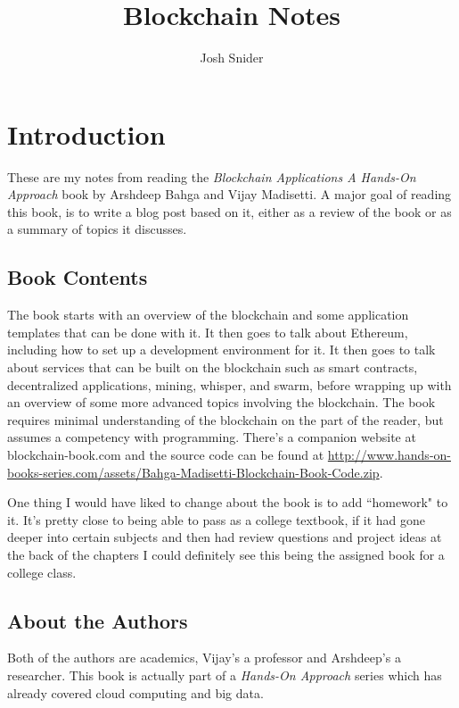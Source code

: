 \documentclass{article}
\begin{document}
\title{Blockchain Notes}
\author{Josh Snider}

\maketitle


\section{Introduction}
These are my notes from reading the \textit{Blockchain Applications A Hands-On Approach} book by Arshdeep Bahga and Vijay Madisetti. A major goal of reading this book, is to write a blog post based on it, either as a review of the book or as a summary of topics it discusses.

\subsection{Book Contents}
The book starts with an overview of the blockchain and some application templates that can be done with it. It then goes to talk about Ethereum, including how to set up a development environment for it. It then goes to talk about services that can be built on the blockchain such as smart contracts, decentralized applications, mining, whisper, and swarm, before wrapping up with an overview of some more advanced topics involving the blockchain. The book requires minimal understanding of the blockchain on the part of the reader, but assumes a competency with programming. There's a companion website at blockchain-book.com and the source code can be found at \url{http://www.hands-on-books-series.com/assets/Bahga-Madisetti-Blockchain-Book-Code.zip}.

One thing I would have liked to change about the book is to add ``homework" to it. It's
pretty close to being able to pass as a college textbook, if it had gone deeper into certain subjects and then had review questions and
project ideas at the back of the chapters I could definitely see this being the assigned book for a college class.

\subsection{About the Authors}

Both of the authors are academics, Vijay's a professor and Arshdeep's a researcher. This book is actually part of a \textit{Hands-On Approach} series which has already covered cloud computing and big data.
\end{document}
